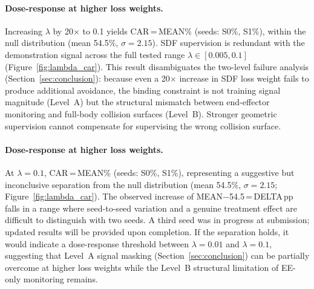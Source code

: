 %
%



\paragraph{Dose-response at higher loss weights.}\label{sec:lambda_high}
Increasing $\lambda$ by 20$\times$ to 0.1 yields CAR\,=\,{MEAN}\% (seeds: {S0}\%, {S1}\%), within the null distribution (mean 54.5\%, $\sigma = 2.15$). SDF supervision is redundant with the demonstration signal across the full tested range $\lambda \in [0.005, 0.1]$ (Figure~\ref{fig:lambda_car}). This result disambiguates the two-level failure analysis (Section~\ref{sec:conclusion}): because even a 20$\times$ increase in SDF loss weight fails to produce additional avoidance, the binding constraint is not training signal magnitude (Level~A) but the structural mismatch between end-effector monitoring and full-body collision surfaces (Level~B). Stronger geometric supervision cannot compensate for supervising the wrong collision surface.



\paragraph{Dose-response at higher loss weights.}\label{sec:lambda_high}
At $\lambda = 0.1$, CAR\,=\,{MEAN}\% (seeds: {S0}\%, {S1}\%), representing a suggestive but inconclusive separation from the null distribution (mean 54.5\%, $\sigma = 2.15$; Figure~\ref{fig:lambda_car}). The observed increase of {MEAN}$-$54.5\,=\,{DELTA}\,pp falls in a range where seed-to-seed variation and a genuine treatment effect are difficult to distinguish with two seeds. A third seed was in progress at submission; updated results will be provided upon completion. If the separation holds, it would indicate a dose-response threshold between $\lambda = 0.01$ and $\lambda = 0.1$, suggesting that Level~A signal masking (Section~\ref{sec:conclusion}) can be partially overcome at higher loss weights while the Level~B structural limitation of EE-only monitoring remains.



